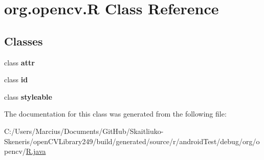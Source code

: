 \hypertarget{classorg_1_1opencv_1_1_r}{}\section{org.\+opencv.\+R Class Reference}
\label{classorg_1_1opencv_1_1_r}
\subsection*{Classes}
\begin{DoxyCompactItemize}
\item 
class {\bfseries attr}
\item 
class {\bfseries id}
\item 
class {\bfseries styleable}
\end{DoxyCompactItemize}


The documentation for this class was generated from the following file\+:\begin{DoxyCompactItemize}
\item 
C\+:/\+Users/\+Marcius/\+Documents/\+Git\+Hub/\+Skaitliuko-\/\+Skeneris/open\+C\+V\+Library249/build/generated/source/r/android\+Test/debug/org/opencv/\mbox{\hyperlink{android_test_2debug_2org_2opencv_2_r_8java}{R.\+java}}\end{DoxyCompactItemize}
